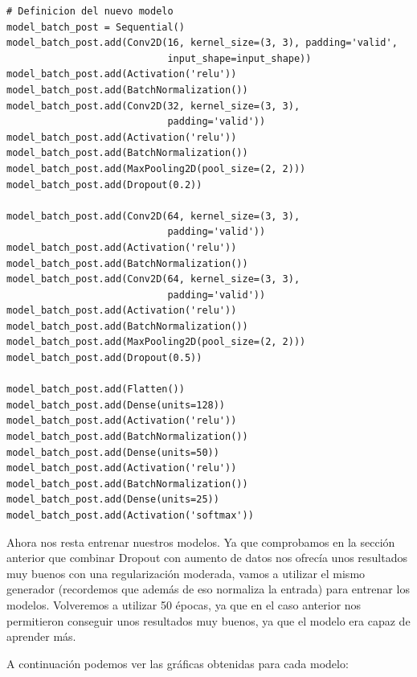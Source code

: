 \documentclass[11pt,a4paper]{article}
\begin{document}
\begin{lstlisting}
# Definicion del nuevo modelo
model_batch_post = Sequential()
model_batch_post.add(Conv2D(16, kernel_size=(3, 3), padding='valid',
							input_shape=input_shape))
model_batch_post.add(Activation('relu'))
model_batch_post.add(BatchNormalization())
model_batch_post.add(Conv2D(32, kernel_size=(3, 3),
							padding='valid'))
model_batch_post.add(Activation('relu'))
model_batch_post.add(BatchNormalization())
model_batch_post.add(MaxPooling2D(pool_size=(2, 2)))
model_batch_post.add(Dropout(0.2))

model_batch_post.add(Conv2D(64, kernel_size=(3, 3),
							padding='valid'))
model_batch_post.add(Activation('relu'))
model_batch_post.add(BatchNormalization())
model_batch_post.add(Conv2D(64, kernel_size=(3, 3),
							padding='valid'))
model_batch_post.add(Activation('relu'))
model_batch_post.add(BatchNormalization())
model_batch_post.add(MaxPooling2D(pool_size=(2, 2)))
model_batch_post.add(Dropout(0.5))

model_batch_post.add(Flatten())
model_batch_post.add(Dense(units=128))
model_batch_post.add(Activation('relu'))
model_batch_post.add(BatchNormalization())
model_batch_post.add(Dense(units=50))
model_batch_post.add(Activation('relu'))
model_batch_post.add(BatchNormalization())
model_batch_post.add(Dense(units=25))
model_batch_post.add(Activation('softmax'))
\end{lstlisting}

Ahora nos resta entrenar nuestros modelos. Ya que comprobamos en la sección anterior que combinar
Dropout con aumento de datos nos ofrecía unos resultados muy buenos con una regularización moderada,
vamos a utilizar el mismo generador (recordemos que además de eso normaliza la entrada) para entrenar
los modelos. Volveremos a utilizar 50 épocas, ya que en el caso anterior nos permitieron conseguir
unos resultados muy buenos, ya que el modelo era capaz de aprender más.

A continuación podemos ver las gráficas obtenidas para cada modelo:
\end{document}
